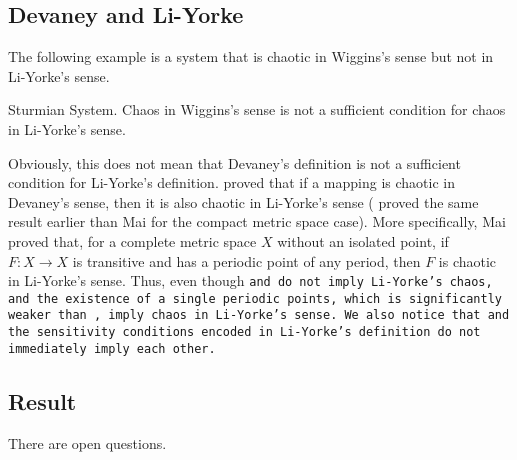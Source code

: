 \documentclass[12pt,twoside,draft]{book}
\begin{document}
\subsection*{Devaney and Li-Yorke}
The following example is a system that is chaotic in Wiggins's sense but not in Li-Yorke's sense.
\begin{example}
  \citep{blanchard}
  Sturmian System.
  Chaos in Wiggins's sense is not a sufficient condition for chaos in Li-Yorke's sense.  
\end{example}
Obviously, this does not mean that Devaney's definition is not a sufficient condition for Li-Yorke's definition.
\citet{mai} proved that if a mapping is chaotic in Devaney's sense, then it is also chaotic in Li-Yorke's sense (\citet{huang} proved the same result earlier than Mai for the compact metric space case).
More specifically, Mai proved that, for a complete metric space $X$ without an isolated point, if $F: X \to X$ is transitive and has a periodic point of any period, then $F$ is chaotic in Li-Yorke's sense.
Thus, even though \tt and \sdic do not imply Li-Yorke's chaos, \tt and the existence of a single periodic points, which is significantly weaker than \dpp, imply chaos in Li-Yorke's sense.
We also notice that \sdic and the sensitivity conditions encoded in Li-Yorke's definition do not immediately imply each other.

\subsection*{Result}
There are open questions.




\printindex
\end{document}
